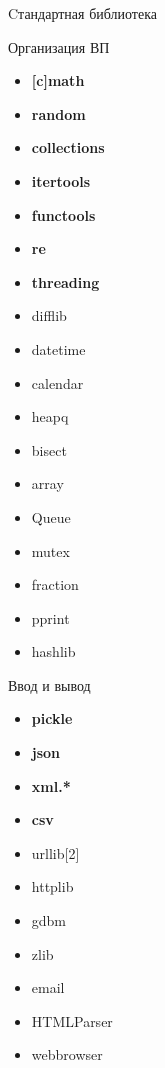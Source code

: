 \documentclass[hyperref={pdftex,unicode}]{beamer}
\begin{document}
\begin{frame}{Cтандартная библиотека}
\footnotesize{
  \begin{minipage}{0.5\linewidth}
    \centering Организация ВП
    \begin{multicols}{2}
    \begin{itemize}
    \item \textbf{[c]math}
    \item \textbf{random}
    \item \textbf{collections}
    \item \textbf{itertools}
    \item \textbf{functools}
    \item \textbf{re}
    \item \textbf{threading}
    \item difflib
    \item datetime
    \item calendar
    \item heapq
    \item bisect
    \item array
    \item Queue
    \item mutex
    \item fraction
    \item pprint
    \item hashlib
    \end{itemize}
  \end{multicols}
  \end{minipage}
  \hfill
  \begin{minipage}{0.25\linewidth}
    \vspace{10mm}
    \centering Ввод и вывод
    \vspace{2.5mm}
    \begin{itemize}
    \item \textbf{pickle}
    \item \textbf{json}
    \item \textbf{xml.*}
    \item \textbf{csv}
    \item urllib[2]
    \item httplib
    \item gdbm
    \item zlib
    \item email
    \item HTMLParser
    \item webbrowser
    \end{itemize}

\end{minipage}}
\end{frame}
\end{document}
